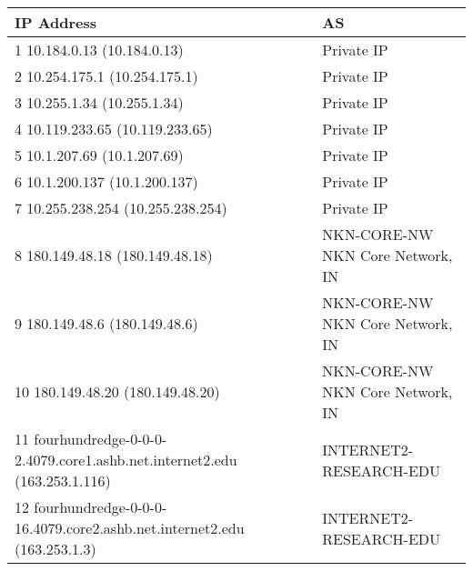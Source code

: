 \begin{table}[!ht]
    \centering
\footnotesize
\begin{tabular}{|l|l|}
\hline
\textbf{IP Address}                                                         & \textbf{AS}                                                                     \\ \hline
1  10.184.0.13 (10.184.0.13)                                                & Private IP                                                                      \\ \hline
2  10.254.175.1 (10.254.175.1)                                               & Private IP                                                                      \\ \hline
3  10.255.1.34 (10.255.1.34)                                                & Private IP                                                                      \\ \hline
4  10.119.233.65 (10.119.233.65)                                            & Private IP                                                                      \\ \hline
5  10.1.207.69 (10.1.207.69)                                                & Private IP                                                                      \\ \hline
6  10.1.200.137 (10.1.200.137)                                              & Private IP                                                                      \\ \hline
7  10.255.238.254 (10.255.238.254)                                          & Private IP                                                                      \\ \hline
8  180.149.48.18 (180.149.48.18)                                            & NKN-CORE-NW NKN Core Network, IN \\ \hline
9  180.149.48.6 (180.149.48.6)                                              & NKN-CORE-NW NKN Core Network, IN \\ \hline
10  180.149.48.20 (180.149.48.20)                                           & NKN-CORE-NW NKN Core Network, IN \\ \hline
11  fourhundredge-0-0-0-2.4079.core1.ashb.net.internet2.edu (163.253.1.116) & INTERNET2-RESEARCH-EDU           \\ \hline
12  fourhundredge-0-0-0-16.4079.core2.ashb.net.internet2.edu (163.253.1.3)  & INTERNET2-RESEARCH-EDU           \\ \hline

\end{tabular}
\end{table}
